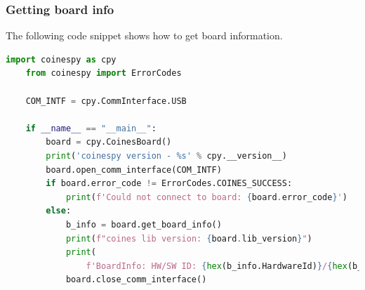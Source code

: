 \documentclass[11pt,headings=small]{scrartcl}
\begin{document}
\subsubsection{Getting board info}\label{GettingBoardInfo}
The following code snippet shows how to get board information.
\begin{lstlisting}[language=python]
	import coinespy as cpy
	from coinespy import ErrorCodes
	
	COM_INTF = cpy.CommInterface.USB
	
	if __name__ == "__main__":
		board = cpy.CoinesBoard()
		print('coinespy version - %s' % cpy.__version__)
		board.open_comm_interface(COM_INTF)
		if board.error_code != ErrorCodes.COINES_SUCCESS:
			print(f'Could not connect to board: {board.error_code}')
		else:
			b_info = board.get_board_info()
			print(f"coines lib version: {board.lib_version}")
			print(
				f'BoardInfo: HW/SW ID: {hex(b_info.HardwareId)}/{hex(b_info.SoftwareId)}')
			board.close_comm_interface()
\end{lstlisting}
\end{document}
